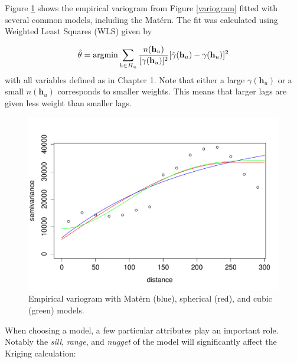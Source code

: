 \documentclass[12pt,twoside]{reedthesis}
\begin{document}
Figure \ref{var_plots} shows the empirical variogram from Figure \ref{variogram} fitted with several common models, including the Mat\'ern. The fit was calculated using Weighted Least Squares (WLS) given by

\begin{align*}
\hat{\mathbf{\theta}} = \text{argmin}\sum_{h \in H_u} {{n(\mathbf{h}_u)}\over{[\gamma(\mathbf{h}_u)]^2}}[\hat\gamma(\mathbf{h}_u) - \gamma(\mathbf{h}_u)]^2
\end{align*}
with all variables defined as in Chapter 1. Note that either a large $\gamma(\mathbf{h}_u)$ or a small $n(\mathbf{h}_u)$ corresponds to smaller weights. This means that larger lags are given less weight than smaller lags. 

\begin{figure}[h]
	   
	       \centering
	  
	    \includegraphics[scale=0.7]{var_plots}
	
	     \caption{Empirical variogram with Mat\'ern (blue), spherical (red), and cubic (green) models.}
	 \label{var_plots}
	\end{figure}

When choosing a model, a few particular attributes play an important role. Notably the \emph{sill}, \emph{range}, and \emph{nugget} of the model will significantly affect the Kriging calculation:
\end{document}
